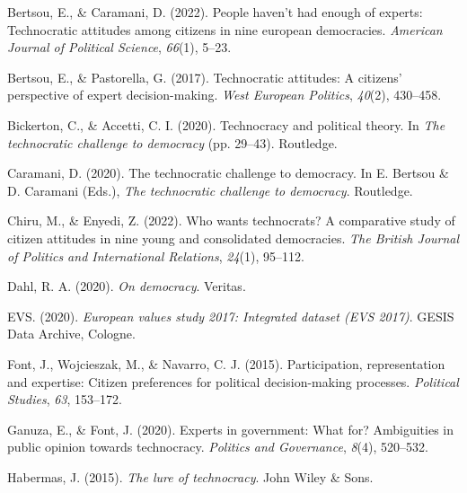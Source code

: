 \documentclass[
  12pt,
  english,
]{article}
\newlength{\cslhangindent}
\newlength{\cslentryspacingunit} %
\newenvironment{CSLReferences}[2] %
 {%
  \setlength{\parindent}{0pt}
  \ifodd #1
  \let\oldpar\par
  \def\par{\hangindent=\cslhangindent\oldpar}
  \fi
  \setlength{\parskip}{#2\cslentryspacingunit}
 }%
 {}
\begin{document}
\hypertarget{refs}{}
\begin{CSLReferences}{1}{0}
\leavevmode{}%
Bertsou, E., \& Caramani, D. (2022). People haven't had enough of
experts: Technocratic attitudes among citizens in nine european
democracies. \emph{American Journal of Political Science}, \emph{66}(1),
5--23.

\leavevmode{}%
Bertsou, E., \& Pastorella, G. (2017). Technocratic attitudes: A
citizens' perspective of expert decision-making. \emph{West European
Politics}, \emph{40}(2), 430--458.

\leavevmode{}%
Bickerton, C., \& Accetti, C. I. (2020). Technocracy and political
theory. In \emph{The technocratic challenge to democracy} (pp. 29--43).
Routledge.

\leavevmode{}%
Caramani, D. (2020). The technocratic challenge to democracy. In E.
Bertsou \& D. Caramani (Eds.), \emph{The technocratic challenge to
democracy}. Routledge.

\leavevmode{}%
Chiru, M., \& Enyedi, Z. (2022). Who wants technocrats? A comparative
study of citizen attitudes in nine young and consolidated democracies.
\emph{The British Journal of Politics and International Relations},
\emph{24}(1), 95--112.

\leavevmode{}%
Dahl, R. A. (2020). \emph{On democracy}. Veritas.

\leavevmode{}%
EVS. (2020). \emph{European values study 2017: Integrated dataset (EVS
2017)}. GESIS Data Archive, Cologne.

\leavevmode{}%
Font, J., Wojcieszak, M., \& Navarro, C. J. (2015). Participation,
representation and expertise: Citizen preferences for political
decision-making processes. \emph{Political Studies}, \emph{63},
153--172.

\leavevmode{}%
Ganuza, E., \& Font, J. (2020). Experts in government: What for?
Ambiguities in public opinion towards technocracy. \emph{Politics and
Governance}, \emph{8}(4), 520--532.

\leavevmode{}%
Habermas, J. (2015). \emph{The lure of technocracy}. John Wiley \& Sons.


\end{CSLReferences}
\end{document}
